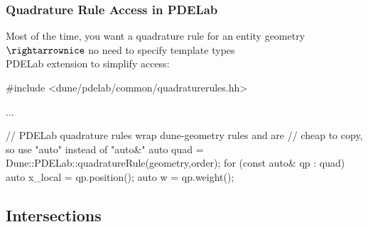 \documentclass[aspectratio=169,11pt]{beamer}
\theoremstyle{definition}
\newcommand{\diffd}{\,d}
\begin{document}
\begin{frame}[fragile]
  \frametitle{Quadrature Rule Access in PDELab}

  Most of the time, you want a quadrature rule for an entity geometry\\[.5em]
  $\rightarrownice$ no need to specify template types\\[1em]

  PDELab extension to simplify access:
\begin{cppcode}
#include <dune/pdelab/common/quadraturerules.hh>

...

// PDELab quadrature rules wrap dune-geometry rules and are
// cheap to copy, so use "auto" instead of "auto&"
auto quad = Dune::PDELab::quadratureRule(geometry,order);
for (const auto& qp : quad)
{
    auto x_local = qp.position();
    auto w = qp.weight();
}
\end{cppcode}

\end{frame}


\subsection{Intersections}
\end{document}
